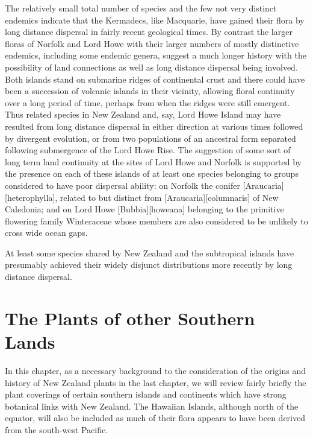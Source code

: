 The relatively small total number of species and the few not very distinct endemics indicate that the Kermadecs, like Macquarie, have gained their flora by long distance dispersal in fairly recent geological times.
By contrast the larger floras of Norfolk and Lord Howe with their larger numbers of mostly distinctive endemics, including some endemic genera, suggest a much longer history with the possibility of land connections as well as long distance dispersal being involved.
Both islands stand on submarine ridges of continental crust and there could have been a succession of volcanic islands in their vicinity, allowing floral continuity over a long period of time, perhaps from when the ridges were still emergent.
Thus related species in New Zealand and, say, Lord Howe Island may have resulted from long distance dispersal in either direction at various times followed by divergent evolution, or from two populations of an ancestral form separated following submergence of the Lord Howe Rise.
The suggestion of some sort of long term land continuity at the sites of Lord Howe and Norfolk is supported by the presence on each of these islands of at least one species belonging to groups considered to have poor dispersal ability: on Norfolk the conifer [Araucaria][heterophylla], related to but distinct from [Araucaria][columnaris] of New Caledonia; and on Lord Howe [Bubbia][howeana] belonging to the primitive flowering family Winteraceae whose members are also considered to be unlikely to cross wide ocean gaps.

At least some species shared by New Zealand and the subtropical islands have presumably achieved their widely disjunct distributions more recently by long distance dispersal.

\chapter{The Plants of other Southern Lands}

In this chapter, as a necessary background to the consideration of the origins and history of New Zealand plants in the last chapter, we will review fairly briefly the plant coverings of certain southern islands and continents which have strong botanical links with New Zealand.
The Hawaiian Islands, although north of the equator, will also be included as much of their flora appears to have been derived from the south-west Pacific.

